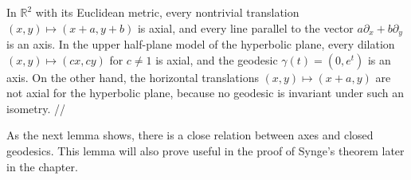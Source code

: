 \begin{example}
\label{ex:axial-isometries}
In $\mathbb{R}^2$ with its Euclidean metric, every nontrivial translation $(x, y) \mapsto (x + a, y + b)$ is axial, and every line parallel to the vector $a\partial_x + b\partial_y$ is an axis. In the upper half-plane model of the hyperbolic plane, every dilation $(x, y) \mapsto (cx, cy)$ for $c \neq 1$ is axial, and the geodesic $\gamma(t) = (0, e^t)$ is an axis. On the other hand, the horizontal translations $(x, y) \mapsto (x + a, y)$ are not axial for the hyperbolic plane, because no geodesic is invariant under such an isometry. //
\end{example}

As the next lemma shows, there is a close relation between axes and closed geodesics. This lemma will also prove useful in the proof of Synge's theorem later in the chapter.

